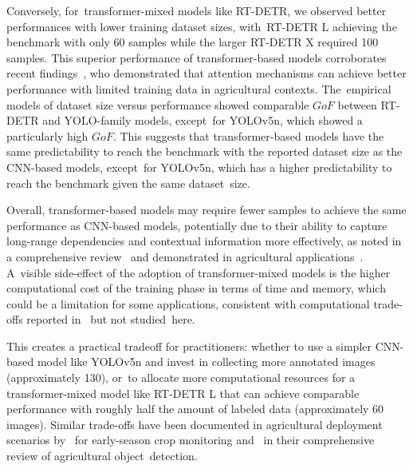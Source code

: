 \documentclass[12pt,a4paper,oneside]{report}
\begin{document}
Conversely, for~transformer-mixed models like RT-DETR, we observed better performances 
with lower training dataset sizes, with~RT-DETR L achieving 
the benchmark with only 60 samples while the larger RT-DETR X required 100 samples. This superior 
performance of transformer-based models corroborates recent findings~\cite{rekavandiTransformersSmallObject2023,liTransformerObjectDetection2023}, 
who demonstrated that attention mechanisms can achieve better 
performance with limited training data in agricultural contexts. The~empirical models of dataset size 
versus performance showed comparable $GoF$ between RT-DETR and YOLO-family models, except~for YOLOv5n,
which showed a particularly high $GoF$. This suggests that transformer-based models have the same 
predictability to reach the benchmark with the reported dataset size as the CNN-based models, except~for YOLOv5n, which has a higher predictability to reach the benchmark given the same dataset~size.

Overall, transformer-based models may require fewer samples to achieve the same performance as CNN-based models,
potentially due to their ability to capture long-range dependencies and contextual information more effectively, 
as noted in a comprehensive review~\cite{khanSurveyVisionTransformers2023} and demonstrated in agricultural 
applications~\cite{badgujarAgriculturalObjectDetection2024}. A~visible side-effect of the adoption of 
transformer-mixed models is the higher computational cost of the training phase in terms of time and memory, 
which could be a limitation for some applications, consistent with computational trade-offs reported in~\cite{carionEndtoEndObjectDetection2020} but not studied~here.

This creates a practical tradeoff for practitioners: whether to use a simpler CNN-based model like YOLOv5n 
and invest in collecting more annotated images (approximately 130), or~to allocate more computational 
resources for a transformer-mixed model like RT-DETR L that can achieve comparable performance with 
roughly half the amount of labeled data (approximately 60 images). Similar trade-offs have been documented 
in agricultural deployment scenarios by~\cite{torres-sanchez_early_2021} for early-season crop monitoring 
and~\cite{badgujarAgriculturalObjectDetection2024} in their comprehensive review of agricultural object~detection.
\end{document}
